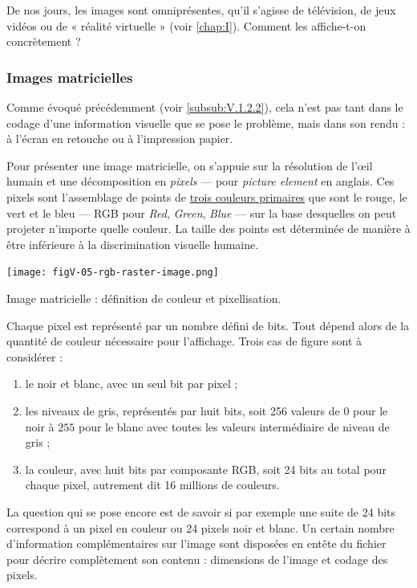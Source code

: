 De nos jours, les images sont omniprésentes, qu'il s'agisse de télévision, de jeux vidéos ou de « réalité virtuelle » (voir \cref{chap:I}). Comment les affiche-t-on concrètement ?

\subsubsection[Images matricielles]{Images matricielles}
\label{subsub:V.2.1.1}

Comme évoqué précédemment (voir \cref{subsub:V.1.2.2}), cela n'est pas tant dans le codage d'une information visuelle que se pose le problème, mais dans son rendu : à l'écran en retouche ou à l'impression papier.

Pour présenter une image matricielle, on s'appuie sur la résolution de l’œil humain et une décomposition en \emph{pixels} --- pour \textit{picture element} en anglais. Ces pixels sont l'assemblage de points de \href{https://fr.wikipedia.org/wiki/Rouge_vert_bleu}{trois couleurs primaires} que sont le rouge, le vert et le bleu --- RGB pour \textit{Red}, \textit{Green}, \textit{Blue} --- sur la base desquelles on peut projeter n'importe quelle couleur. La taille des points est déterminée de manière à être inférieure à la discrimination visuelle humaine.

\begin{marginfigure}%
\texttt{[image: figV-05-rgb-raster-image.png]}
\caption{\label{fig:V.5}Image matricielle : définition de couleur et pixellisation.}
\end{marginfigure}

Chaque pixel est représenté par un nombre défini de bits. Tout dépend alors de la quantité de couleur nécessaire pour l'affichage. Trois cas de figure sont à considérer :
\begin{enumerate}
	\item le noir et blanc, avec un seul bit par pixel ;
	\item les niveaux de gris, représentés par huit bits, soit 256 valeurs de $0$ pour le noir à $255$ pour le blanc avec toutes les valeurs intermédiaire de niveau de gris ;
	\item la couleur, avec huit bits par composante RGB, soit 24 bits au total pour chaque pixel, autrement dit 16 millions de couleurs.
\end{enumerate}

La question qui se pose encore est de savoir si par exemple une suite de 24 bits correspond à un pixel en couleur ou 24 pixels noir et blanc. Un certain nombre d'information complémentaires sur l'image sont disposées en entête du fichier pour décrire complètement son contenu : dimensions de l'image et codage des pixels.

